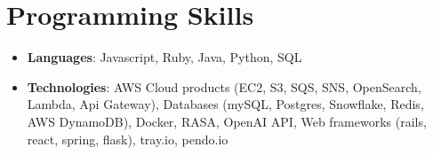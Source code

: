 \documentclass[a4paper,11pt]{article}
\newcommand{\resumeItem}[2]{
  \item\small{
    \textbf{#1}{: #2 \vspace{-2pt}}
  }
}
\newcommand{\resumeItemListStart}{\begin{itemize}}
\newcommand{\resumeItemListEnd}{\end{itemize}\vspace{-5pt}}
\begin{document}
\section{Programming Skills}
  \resumeItemListStart
    \resumeItem{Languages}
      {Javascript, Ruby, Java, Python, SQL}
    \resumeItem{Technologies}
      {AWS Cloud products (EC2, S3, SQS, SNS, OpenSearch, Lambda, Api Gateway), Databases (mySQL, Postgres, Snowflake, Redis, AWS DynamoDB), Docker, RASA, OpenAI API, Web frameworks (rails, react, spring, flask), tray.io, pendo.io }
  \resumeItemListEnd





\end{document}
